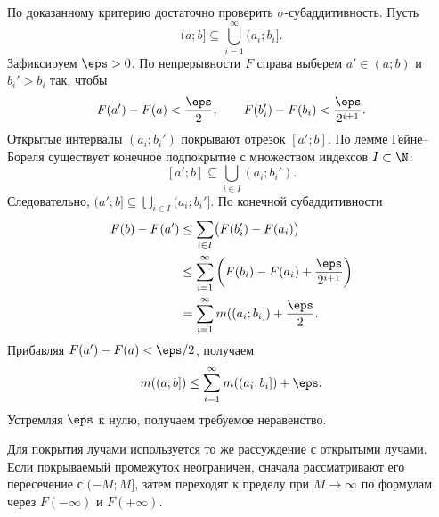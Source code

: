 \begin{Proof}
    По доказанному критерию достаточно проверить $\sigma$-субаддитивность.
    Пусть
    \[
        (a;b]\subseteq\bigcup_{i=1}^{\infty}(a_i;b_i].
    \]
    Зафиксируем $\eps>0$. По непрерывности $F$ справа выберем
    $a'\in(a;b)$ и $b_i'>b_i$ так, чтобы
    \[
        F(a')-F(a)<\frac\eps2,\qquad
        F(b_i')-F(b_i)<\frac{\eps}{2^{i+1}}.
    \]
    Открытые интервалы $(a_i;b_i')$ покрывают отрезок $[a';b]$.
    По лемме Гейне--Бореля существует конечное подпокрытие
    с множеством индексов $I\subset\N$:
    \[
        [a';b]\subseteq\bigcup_{i\in I}(a_i;b_i').
    \]
    Следовательно, $(a';b]\subseteq\bigcup_{i\in I}(a_i;b_i']$.
    По конечной субаддитивности
    \[
        \begin{aligned}
            F(b)-F(a')
            &\leq\sum_{i\in I}\bigl(F(b_i')-F(a_i)\bigr)\\
            &\leq\sum_{i=1}^{\infty}
                 \left(F(b_i)-F(a_i)+\frac{\eps}{2^{i+1}}\right)\\
            &=\sum_{i=1}^{\infty}m((a_i;b_i])+\frac\eps2.
        \end{aligned}
    \]
    Прибавляя $F(a')-F(a)<\eps/2$, получаем
    \[
        m((a;b])\leq\sum_{i=1}^{\infty}m((a_i;b_i])+\eps.
    \]
    Устремляя $\eps$ к нулю, получаем требуемое неравенство.
\end{Proof}

\begin{remark}
    Для покрытия лучами используется то же рассуждение с открытыми лучами.
    Если покрываемый промежуток неограничен, сначала рассматривают его
    пересечение с $(-M;M]$, затем переходят к пределу при $M\to\infty$
    по формулам через $F(-\infty)$ и $F(+\infty)$.
\end{remark}
\endgroup
